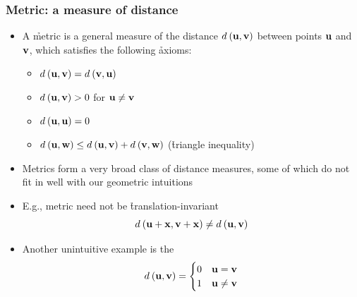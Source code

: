 \documentclass[t]{beamer} %
\begin{document}
\begin{frame}
  \frametitle{Metric: a measure of distance}

  \begin{itemize}
  \item A \h{metric} is a general measure of the distance $\dist{\vu}{\vv}$
    between points $\vu$ and $\vv$, which satisfies the following \h{axioms}:
    \begin{itemize}
      \item $\dist{\vu}{\vv} = \dist{\vv}{\vu}$
      \item $\dist{\vu}{\vv} > 0$ for $\vu \neq \vv$
      \item $\dist{\vu}{\vu} = 0$
      \item $\dist{\vu}{\vw} \leq \dist{\vu}{\vv} + \dist{\vv}{\vw}$
        (\h{triangle inequality})
    \end{itemize}
    \pause
  \item Metrics form a very broad class of distance measures, some of which do
    not fit in well with our geometric intuitions%
    \pause
  \item E.g., metric need not be \h{translation-invariant}
    \[ \dist{\vu+\vx}{\vv+\vx} \neq \dist{\vu}{\vv} \]
    \pause\ungap
  \item Another unintuitive example is the 
    \[
    \dist{\vu}{\vv} =
    \begin{cases}
      0 & \vu = \vv \\
      1 & \vu \neq \vv
    \end{cases}
    \]
  \end{itemize}
\end{frame}
\end{document}
